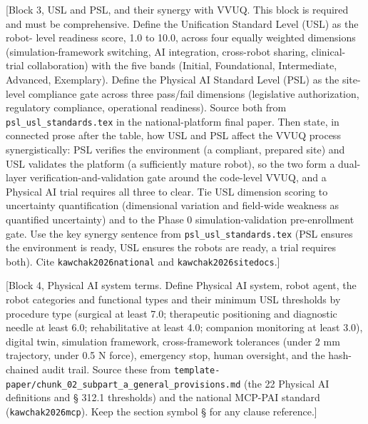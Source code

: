 [Block 3, USL and PSL, and their synergy with VVUQ. This block is required and
must be comprehensive. Define the Unification Standard Level (USL) as the robot-
level readiness score, 1.0 to 10.0, across four equally weighted dimensions
(simulation-framework switching, AI integration, cross-robot sharing, clinical-
trial collaboration) with the five bands (Initial, Foundational, Intermediate,
Advanced, Exemplary). Define the Physical AI Standard Level (PSL) as the site-
level compliance gate across three pass/fail dimensions (legislative
authorization, regulatory compliance, operational readiness). Source both from
\texttt{psl\_usl\_standards.tex} in the national-platform final paper. Then state,
in connected prose after the table, how USL and PSL affect the VVUQ process
synergistically: PSL verifies the environment (a compliant, prepared site) and
USL validates the platform (a sufficiently mature robot), so the two form a dual-
layer verification-and-validation gate around the code-level VVUQ, and a Physical
AI trial requires all three to clear. Tie USL dimension scoring to uncertainty
quantification (dimensional variation and field-wide weakness as quantified
uncertainty) and to the Phase 0 simulation-validation pre-enrollment gate. Use the
key synergy sentence from \texttt{psl\_usl\_standards.tex} (PSL ensures the
environment is ready, USL ensures the robots are ready, a trial requires both).
Cite \texttt{kawchak2026national} and \texttt{kawchak2026sitedocs}.]

[Block 4, Physical AI system terms. Define Physical AI system, robot agent, the
robot categories and functional types and their minimum USL thresholds by
procedure type (surgical at least 7.0; therapeutic positioning and diagnostic
needle at least 6.0; rehabilitative at least 4.0; companion monitoring at least
3.0), digital twin, simulation framework, cross-framework tolerances (under 2 mm
trajectory, under 0.5 N force), emergency stop, human oversight, and the hash-
chained audit trail. Source these from
\texttt{template-paper/chunk\_02\_subpart\_a\_general\_provisions.md} (the 22
Physical AI definitions and § 312.1 thresholds) and the national MCP-PAI standard
(\texttt{kawchak2026mcp}). Keep the section symbol § for any clause reference.]

